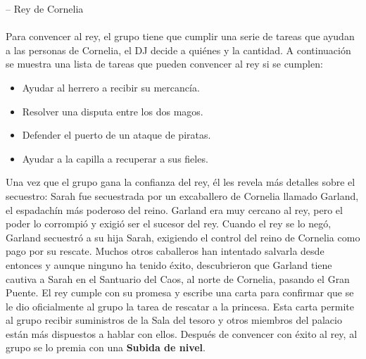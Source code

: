 \indent -- Rey de Cornelia \\\\
Para convencer al rey, el grupo tiene que cumplir una serie de tareas que ayudan a las personas de Cornelia, el DJ decide a quiénes y la cantidad. A continuación se muestra una lista de tareas que pueden convencer al rey si se cumplen:
\begin{itemize}[leftmargin=*]
	\item Ayudar al herrero a recibir su mercancía.
	\item Resolver una disputa entre los dos magos.
	\item Defender el puerto de un ataque de piratas.
	\item Ayudar a la capilla a recuperar a sus fieles.
\end{itemize}
Una vez que el grupo gana la confianza del rey, él les revela más detalles sobre el secuestro: Sarah fue secuestrada por un excaballero de Cornelia llamado Garland, el espadachín más poderoso del reino. Garland era muy cercano al rey, pero el poder lo corrompió y exigió ser el sucesor del rey. Cuando el rey se lo negó, Garland secuestró a su hija Sarah, exigiendo el control del reino de Cornelia como pago por su rescate. Muchos otros caballeros han intentado salvarla desde entonces y aunque ninguno ha tenido éxito, descubrieron que Garland tiene cautiva a Sarah en el Santuario del Caos, al norte de Cornelia, pasando el Gran Puente. El rey cumple con su promesa y escribe una carta para confirmar que se le dio oficialmente al grupo la tarea de rescatar a la princesa. Esta carta permite al grupo recibir suministros de la Sala del tesoro y otros miembros del palacio están más dispuestos a hablar con ellos. Después de convencer con éxito al rey, al grupo se lo premia con una \textbf{Subida de nivel}.
